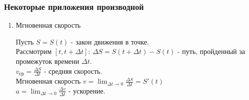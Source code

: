 \documentclass[12pt]{article}
\begin{document}
    \subsubsection*{Некоторые приложения производной}
    \begin{enumerate}
        \item Мгновенная скорость\par\noindent
        Пусть $S = S(t)$ - закон движения в точке.\\
        Рассмотрим $[ t, t + \Delta t ]$: $\Delta S = S(t+\Delta t) - S(t)$ - путь, пройденный за промежуток времени $\Delta t$.\\
        $v_{\text{ср}} = \frac{\Delta S}{\Delta t}$ - средняя скорость.\\
        Мгновенная скорость $v = \lim_{\Delta t \to 0} \frac{\Delta S}{\Delta t} = S'(t)$\\
        $a = \lim_{\Delta t \to 0} \frac{\Delta v}{\Delta t}$ - ускорение.    
    \end{enumerate}
\end{document}
